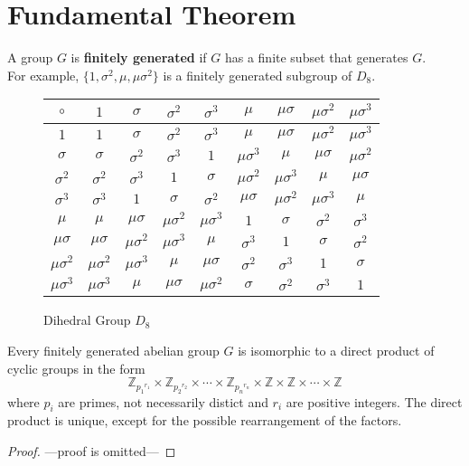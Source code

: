 \section{Fundamental Theorem}
\begin{definition}
	A group $G$ is \textbf{finitely generated} if $G$ has a finite subset that generates $G$.\\
	For example, $\{ 1,\sigma^2,\mu,\mu\sigma^2 \}$ is a finitely generated subgroup of $D_8$.
\end{definition}

\begin{figure}[h]
	\centering
	\begin{tabular}{c|cccccccc}
		$\circ$ & $1$ & $\sigma$ & $\sigma^2$ & $\sigma^3$ & $\mu$ & $\mu\sigma$ & $\mu\sigma^2$ & $\mu\sigma^3$ \\ \hline
		$1$ & $1$ & $\sigma$ & $\sigma^2$ & $\sigma^3$ & $\mu$ & $\mu\sigma$ & $\mu\sigma^2$ & $\mu\sigma^3$ \\ 
		$\sigma$ & $\sigma$ & $\sigma^2$ & $\sigma^3$ & $1$ & $\mu\sigma^3$ & $\mu$ & $\mu\sigma$ & $\mu\sigma^2$ \\
		$\sigma^2$ & $\sigma^2$ & $\sigma^3$ & $1$ & $\sigma$ & $\mu\sigma^2$ & $\mu\sigma^3$ & $\mu$ & $\mu\sigma$ \\
		$\sigma^3$ & $\sigma^3$ & $1$ & $\sigma$ & $\sigma^2$ & $\mu\sigma$ & $\mu\sigma^2$ & $\mu\sigma^3$ & $\mu$ \\
		$\mu$ & $\mu$ & $\mu\sigma$ & $\mu\sigma^2$ & $\mu\sigma^3$ & $1$ & $\sigma$ & $\sigma^2$ & $\sigma^3$ \\
		$\mu\sigma$ & $\mu\sigma$ & $\mu\sigma^2$ & $\mu\sigma^3$ & $\mu$ & $\sigma^3$ & $1$ & $\sigma$ & $\sigma^2$ \\
		$\mu\sigma^2$ & $\mu\sigma^2$ & $\mu\sigma^3$ & $\mu$ & $\mu\sigma$ & $\sigma^2$ & $\sigma^3$ & $1$ & $\sigma$ \\
		$\mu\sigma^3$ & $\mu\sigma^3$ & $\mu$ & $\mu\sigma$ & $\mu\sigma^2$ & $\sigma$ & $\sigma^2$ & $\sigma^3$ & $1$
	\end{tabular}
	\caption{Dihedral Group $D_8$}
\end{figure}

\begin{theorem}
	Every finitely generated abelian group $G$ is isomorphic to a direct product of cyclic groups in the form
	$$\mathbb{Z}_{{p_1}^{r_1}} \times\mathbb{Z}_{{p_2}^{r_2}} \times \cdots \times \mathbb{Z}_{{p_n}^{r_n}} \times \mathbb{Z} \times \mathbb{Z} \times \cdots \times \mathbb{Z}$$
	where $p_i$ are primes, not necessarily distict and $r_i$ are positive integers. The direct product is unique, except for the possible rearrangement of the factors.
\end{theorem}
\begin{proof}
	---proof is omitted---
\end{proof}

